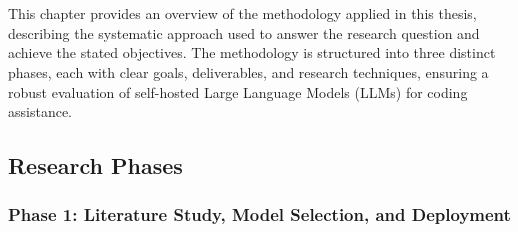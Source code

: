 
\chapter{}%
\label{ch:methodologie}


This chapter provides an overview of the methodology applied in this thesis, describing the systematic approach used to answer the research question and achieve the stated objectives. The methodology is structured into three distinct phases, each with clear goals, deliverables, and research techniques, ensuring a robust evaluation of self-hosted Large Language Models (LLMs) for coding assistance.
\section{Research Phases}
\label{sec:research-phases}

\subsection{Phase 1: Literature Study, Model Selection, and Deployment}

